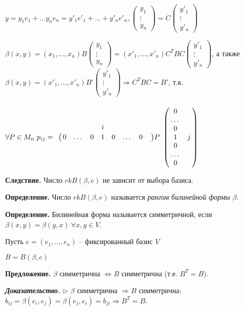 $y = y_1 e_1 + \dots y_n e_n = y'_1 e'_1 + \dots + y'_n e'_n, \begin{pmatrix} y_1 \\ \vdots \\ y_n \end{pmatrix} = C \begin{pmatrix} y'_1 \\ \vdots \\ y'_n \end{pmatrix}$

$\beta(x,y) = (x_1, \dots, x_n) B \begin{pmatrix} y_1 \\ \vdots \\ y_n \end{pmatrix} = (x'_1, \dots, x'_n) C^T B C \begin{pmatrix} y'_1 \\ \vdots \\ y'_n \end{pmatrix}$, а также $\beta(x,y) = (x'_1, \dots, x'_n) B' \begin{pmatrix} y'_1 \\ \vdots \\ y'_n \end{pmatrix} \Rightarrow C^{T}BC = B'$, т.к. $\forall P \in M_n \ p_{ij} = \bordermatrix{ 
& & & & i & & & &  \cr 
& 0 & \dots & 0 & 1 & 0 & \dots & 0}  P \bordermatrix{ &  \cr
& 0  \cr
& \dots  \cr
& 0  \cr 
& 1 & j  \cr
& 0  \cr
& \dots  \cr
& 0  \cr
} $

\bigskip
\textbf{Следствие.} Число $rkB(\beta, e)$ не зависит от выбора базиса.

\bigskip
\textbf{Определение.} Число $rk B(\beta, e)$ называется \textit{рангом билинейной формы} $\beta$.

\bigskip
\textbf{Определение.} Билинейная форма называется симметричной, если $\beta(x, y) = \beta(y, x) \ \forall x, y \in V$.

\bigskip
Пусть $e = (e_1, \dots, e_n)$ -- фиксированный базис $V$

$B = B(\beta, e)$

\bigskip
\textbf{Предложение.} $\beta$ симметрична $\Leftrightarrow B$ симметрична (т.е. $B^T = B$).

\bigskip
\textbf{\textit{Доказательство.}} $\rhd$  $\beta$ симметрична $\Rightarrow B$ симметрична: $b_{ij} = \beta(e_i, e_j) = \beta(e_j, e_i) = b_{ji} \Rightarrow B^T = B$.

